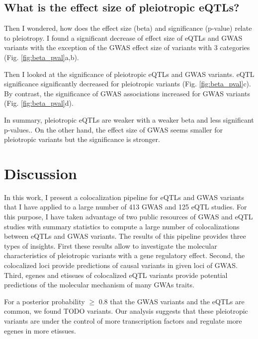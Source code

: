 \subsection*{What is the effect size of pleiotropic eQTLs?}

Then I wondered, how does the effect size (beta) and significance (p-value) relate to pleiotropy.
%
I found a significant decrease of effect size of eQTLs and GWAS variants with the exception of the GWAS effect size of variants with 3 categories (Fig. \ref{fig:beta_pval}a,b).

Then I looked at the significance of pleiotropic eQTLs and GWAS variants.
%
eQTL significance significantly decreased for pleiotropic variants (Fig. \ref{fig:beta_pval}c).
%
By contrast, the significance of GWAS associations increased for GWAS variants (Fig. \ref{fig:beta_pval}d).

In summary, pleiotropic eQTLs are weaker with a weaker beta and less significant p-values..
%
On the other hand, the effect size of GWAS seems smaller for pleiotropic variants but the significance is stronger.

\section*{Discussion}


In this work, I present a colocalization pipeline for eQTLs and GWAS variants that I have applied to a large number of 413 GWAS and 125 eQTL studies.
%
For this purpose, I have taken advantage of two public resources of GWAS and eQTL studies with summary statistics to compute a large number of colocalizations between eQTLs and GWAS variants.
%
The results of this pipeline provides three types of insights.
%
First these results allow to investigate the molecular characteristics of pleiotropic variants with a gene regulatory effect.
%
Second, the colocalized loci provide predictions of causal variants in given loci of GWAS.
%
Third, egenes and etissues of colocalized eQTL variants provide potential predictions of the molecular mechanism of many GWAs traits.


For a posterior probability $\ge$ 0.8 that the GWAS variants and the eQTLs are common, we found TODO variants.
%
Our analysis suggests that these pleiotropic variants are under the control of more transcription factors and regulate more egenes in more etissues.


